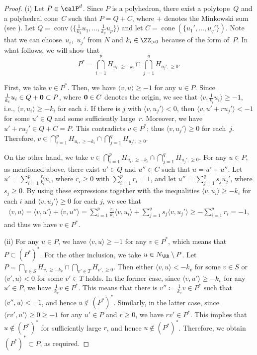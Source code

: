 \begin{proof}(i) Let $P \in \calP^d$. Since $P$ is a polyhedron, there exist a polytope~$Q$ and a polyhedral cone~$C$ such that
$P=Q+C$, where $+$ denotes the Minkowski sum (see \cite[Corollary~7.1b]{Sch}).
Let $Q=\operatorname{conv}\big(\big\{\frac{1}{k_1}u_1,\dots,\frac{1}{k_p}u_p\big\}\big)$ and let $C=\operatorname{cone}(\{u_1',\dots,u_q'\})$.
Note that we can choose~$u_i$,~$u_j'$ from $N$ and $k_i \in \ZZ_{>0}$ because of the form of~$P$.
In what follows, we will show that
\begin{displaymath}
P^*=\bigcap_{i=1}^p H_{u_i,\geq -k_i} \cap \bigcap_{j=1}^qH_{u_j',\geq 0}.
\end{displaymath}

First, we take $v \in P^*$. Then, we have $\langle v,u \rangle \geq -1$ for any $u \in P$.
Since $\frac{1}{k_i}u_i \in Q+{\bf 0} \subset P$, where ${\bf 0} \in C$ denotes the origin,
we see that $\langle v, \frac{1}{k_i}u_i \rangle \geq -1$, i.e., $\langle v, u_i \rangle \geq -k_i$ for each $i$.
If there is $j$ with $\langle v,u_j' \rangle<0$, then $\langle v, u'+ru_j' \rangle < -1$ for some $u' \in Q$ and some sufficiently large~$r$.
Moreover, we have $u'+ru_j' \in Q+C=P$. This contradicts $v \in P^*$; thus $\langle v,u_j' \rangle\geq 0$ for each~$j$.
Therefore, $v \in \bigcap_{i=1}^p H_{u_i,\geq -k_i} \cap \bigcap_{j=1}^qH_{u_j',\geq 0}$.

On the other hand, we take $v \in \bigcap_{i=1}^p H_{u_i,\geq -k_i} \cap \bigcap_{j=1}^qH_{u_j',\geq 0}$.
For any $u \in P$, as mentioned above, there exist $u' \in Q$ and $u'' \in C$ such that $u=u'+u''$.
Let $u'=\sum_{i=1}^p \frac{r_i}{k_i}u_i$, where $r_i \geq 0$ with $\sum_{i=1}^pr_i=1$, and let $u''=\sum_{j=1}^q s_ju_j'$, where $s_j \geq 0$.
By using these expressions together with the inequalities $\langle v,u_i \rangle \geq -k_i$ for each $i$ and $\langle v,u_j' \rangle \geq 0$ for each $j$, we see that
\begin{align*}
\langle v,u \rangle = \langle v,u' \rangle+\langle v,u'' \rangle =
\sum_{i=1}^p \frac{r_i}{k_i}\langle v,u_i \rangle+\sum_{j=1}^q s_j\langle v,u_j' \rangle \geq -\sum_{i=1}^pr_i=-1,
\end{align*}
and thus we have $v \in P^*$.

(ii) For any $u \in P$, we have $\langle v,u\rangle\geq -1$ for any $v \in P^*$, which means that $P \subset (P^*)^*$.
For the other inclusion, we take $u \in N_\RR \setminus P$.
Let $P=\bigcap_{v \in S} H_{v,\geq -k_v} \cap \bigcap_{v' \in T}H_{v',\geq 0}$.
Then either $\langle v,u \rangle <-k_v$ for some $v \in S$ or $\langle v',u \rangle < 0$ for some $v' \in T$ holds.
In the former case, since $\langle v,u' \rangle \geq -k_v$ for any $u' \in P$, we have $\frac{1}{k_v}v \in P^*$.
This means that there is $v''\coloneqq\frac{1}{k_v}v \in P^*$ such that $\langle v'',u \rangle<-1$, and hence $u \not\in (P^*)^*$.
Similarly, in the latter case, since $\langle rv',u' \rangle \geq 0 \geq -1$ for any $u' \in P$ and $r \geq 0$, we have $rv' \in P^*$.
This implies that $u \not\in (P^*)^*$ for sufficiently large $r$, and hence $u \not\in (P^*)^*$. Therefore, we obtain $(P^*)^* \subset P$, as required.
\end{proof}


